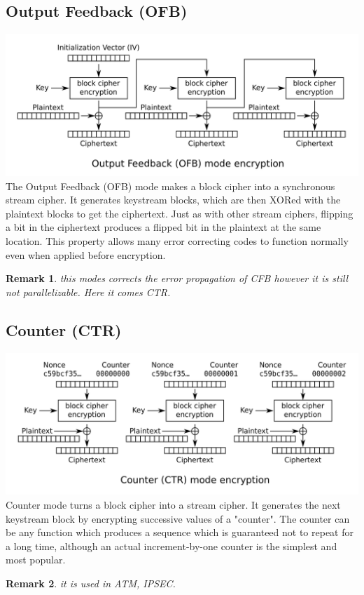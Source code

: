 \documentclass[10pt,a4paper]{article}
\newtheorem{remark}{Remark}
\begin{document}
\subsection{Output Feedback (OFB)}
\includegraphics[scale=0.2]{img/OFB.png}
\newline 
The Output Feedback (OFB) mode makes a block cipher into a synchronous stream cipher. It generates keystream blocks, which are then XORed with the plaintext blocks to get the ciphertext. Just as with other stream ciphers, flipping a bit in the ciphertext produces a flipped bit in the plaintext at the same location. This property allows many error correcting codes to function normally even when applied before encryption.
\begin{remark} this modes corrects the error propagation of CFB however  it is still not parallelizable. Here it comes CTR. \end{remark}
\subsection{Counter (CTR)}
\includegraphics[scale=0.2]{img/CTR.png}
\newline 
Counter mode turns a block cipher into a stream cipher. It generates the next keystream block by encrypting successive values of a "counter". The counter can be any function which produces a sequence which is guaranteed not to repeat for a long time, although an actual increment-by-one counter is the simplest and most popular.
\begin{remark} it is used in ATM, IPSEC. \end{remark}
\end{document}
